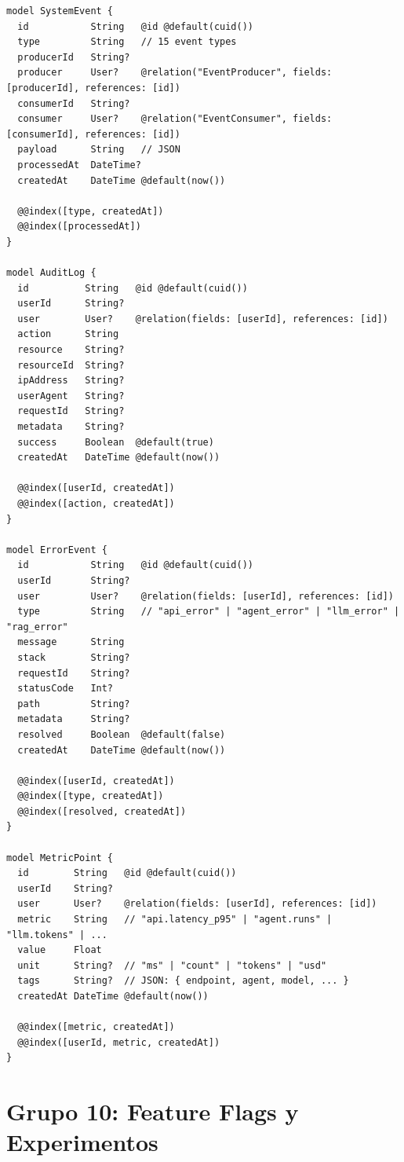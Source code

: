 \begin{lstlisting}[style=sql,caption={Modelos de eventos del sistema, auditoría y métricas}]
model SystemEvent {
  id           String   @id @default(cuid())
  type         String   // 15 event types
  producerId   String?
  producer     User?    @relation("EventProducer", fields: [producerId], references: [id])
  consumerId   String?
  consumer     User?    @relation("EventConsumer", fields: [consumerId], references: [id])
  payload      String   // JSON
  processedAt  DateTime?
  createdAt    DateTime @default(now())

  @@index([type, createdAt])
  @@index([processedAt])
}

model AuditLog {
  id          String   @id @default(cuid())
  userId      String?
  user        User?    @relation(fields: [userId], references: [id])
  action      String
  resource    String?
  resourceId  String?
  ipAddress   String?
  userAgent   String?
  requestId   String?
  metadata    String?
  success     Boolean  @default(true)
  createdAt   DateTime @default(now())

  @@index([userId, createdAt])
  @@index([action, createdAt])
}

model ErrorEvent {
  id           String   @id @default(cuid())
  userId       String?
  user         User?    @relation(fields: [userId], references: [id])
  type         String   // "api_error" | "agent_error" | "llm_error" | "rag_error"
  message      String
  stack        String?
  requestId    String?
  statusCode   Int?
  path         String?
  metadata     String?
  resolved     Boolean  @default(false)
  createdAt    DateTime @default(now())

  @@index([userId, createdAt])
  @@index([type, createdAt])
  @@index([resolved, createdAt])
}

model MetricPoint {
  id        String   @id @default(cuid())
  userId    String?
  user      User?    @relation(fields: [userId], references: [id])
  metric    String   // "api.latency_p95" | "agent.runs" | "llm.tokens" | ...
  value     Float
  unit      String?  // "ms" | "count" | "tokens" | "usd"
  tags      String?  // JSON: { endpoint, agent, model, ... }
  createdAt DateTime @default(now())

  @@index([metric, createdAt])
  @@index([userId, metric, createdAt])
}
\end{lstlisting}

\section{Grupo 10: Feature Flags y Experimentos}

